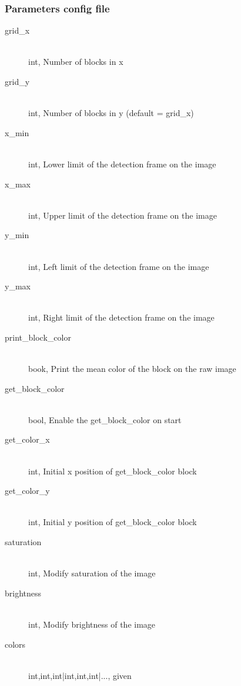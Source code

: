     \subsubsection{Parameters config file}
    \label{sec:md:howto:params}
        \begin{description}
            \item[grid\_x] \hfill \\ int, Number of blocks in x
            \item[grid\_y] \hfill \\ int,  Number of blocks in y 
                (default = grid\_x)
            \item[x\_min] \hfill \\ int, Lower limit of the detection 
                frame on the image
            \item[x\_max] \hfill \\ int, Upper limit of the detection 
                frame on the image
            \item[y\_min] \hfill \\ int, Left limit of the detection frame 
                on the image
            \item[y\_max] \hfill \\ int, Right limit of the detection 
                frame on the image
            \item[print\_block\_color] \hfill \\ book, Print the mean 
                color of the block on the raw image
            \item[get\_block\_color] \hfill \\ bool, Enable the 
                get\_block\_color on start
            \item[get\_color\_x] \hfill \\ int,  Initial x position of 
                get\_block\_color block
            \item[get\_color\_y] \hfill \\ int,  Initial y position of 
                get\_block\_color block
            \item[saturation] \hfill \\ int,  Modify saturation of the 
                image
            \item[brightness] \hfill \\ int,  Modify brightness of the 
                image
            \item[colors] \hfill \\ int,int,int|int,int,int|..., given 

\end{description}
